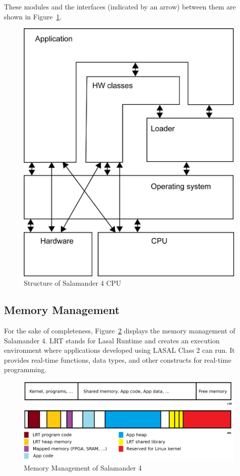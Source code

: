 \documentclass[MMR,Master,english]{style/twbook}
\begin{document}
\clearpage

\noindent These modules and the interfaces (indicated by an arrow) between them are shown in Figure~\ref{fig:lasal_cpu}.

\begin{figure}[H]
	\centering
	\includegraphics[width=0.5\columnwidth]{img/methodology/Software-Struktur_einer_LASAL_CPU.png}
	\caption[Structure of Salamander 4 CPU]{Structure of Salamander 4 CPU~\cite{LASALOSSIGMATEK}}
	\label{fig:lasal_cpu}
\end{figure}

\subsection{Memory Management}
\noindent For the sake of completeness, Figure~\ref{fig:memory_management} displays the memory management of Salamander 4. LRT stands for Lasal Runtime and creates an execution environment where applications developed using LASAL Class 2 can run. It provides real-time functions, data types, and other constructs for real-time programming.

\begin{figure}[H]
	\centering
	\includegraphics[width=0.8\columnwidth]{img/methodology/RAM_Memory_management.png}
	\caption[Memory Management of Salamander 4]{Memory Management of Salamander 4~\cite{LASALOSSIGMATEK}}
	\label{fig:memory_management}
\end{figure}
\end{document}
